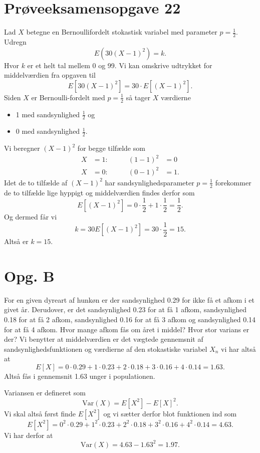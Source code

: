 \documentclass[12pt]{article}
\theoremstyle{definition}
\begin{document}
\section*{Prøveeksamensopgave 22}
Lad $X$ betegne en Bernoullifordelt stokastisk variabel med parameter $p = \frac{1}{2}$. Udregn
\[ 
E(30(X-1)^2) = k
.\]
Hvor $k$ er et helt tal mellem 0 og 99.
\bigbreak
Vi kan omskrive udtrykket for middelværdien fra opgaven til
\[ 
  E \left[ 30(X-1)^2 \right] = 30 \cdot E[(X-1)^2]
.\]
Siden $X$ er Bernoulli-fordelt med $p = \frac{1}{2}$ så tager $X$ værdierne
\begin{itemize}
  \item 1 med sandsynlighed $\frac{1}{2}$ og
  \item 0 med sandsynlighed $\frac{1}{2}$.
\end{itemize}
Vi beregner $(X-1)^2$ for begge tilfælde som 
\begin{align*}
  X &= 1: &\qquad (1-1)^2 &= 0 \\
  X &= 0: &\qquad (0-1)^2 &= 1
.\end{align*}
Idet de to tilfælde af $(X-1)^2$ har sandsynlighedsparameter $p = \frac{1}{2}$ forekommer de to tilfælde lige hyppigt og middelværdien findes derfor som
\[ 
E \left[ (X-1)^2 \right] = 0 \cdot \frac{1}{2} + 1 \cdot \frac{1}{2} = \frac{1}{2}
.\]
Og dermed får vi
\[ 
k = 30E \left[ (X-1)^2 \right] = 30 \cdot \frac{1}{2} = 15
.\]
Altså er $k = 15$.


\section*{Opg. B}
For en given dyreart af hunkøn er der sandsynlighed \num{0,29} for ikke få et afkom i et givet år. Derudover, er det sandsynlighed \num{0,23} for at få 1 afkom, sandsynlighed \num{0,18} for at få 2 afkom, sandsynlighed \num{0,16} for at få 3 afkom og sandsynlighed \num{0,14} for at få 4 afkom. Hvor mange afkom fås om året i middel? Hvor stor varians er der?
\bigbreak
Vi benytter at middelværdien er det vægtede gennemsnit af sandsynlighedsfunktionen og værdierne af den stokastiske variabel $X_n$ vi har altså at
\[ 
  E[X] = 0 \cdot \num{0,29} + 1 \cdot \num{0,23} + 2 \cdot \num{0,18} + 3 \cdot \num{0,16} + 4 \cdot \num{0,14} = \num{1,63} 
.\]
Altså fås i gennemsnit \num{1,63} unger i populationen.

Variansen er defineret som
\[ 
  \mathrm{Var}(X) = E \left[ X^2 \right] - E[X]^2
.\]
Vi skal altså først finde $E \left[ X^2 \right]$ og vi sætter derfor blot funktionen ind som
\[ 
E \left[ X^2 \right] = 0^2 \cdot \num{0,29} + 1^2 \cdot \num{0,23} + 2^2 \cdot \num{0,18} + 3^2 \cdot \num{0,16} + 4^2 \cdot \num{0,14}  = \num{4,63} 
.\]
Vi har derfor at
\[ 
  \mathrm{Var}(X) = \num{4,63} - \num{1,63}^2 = \num{1,97} 
.\]
\end{document}
